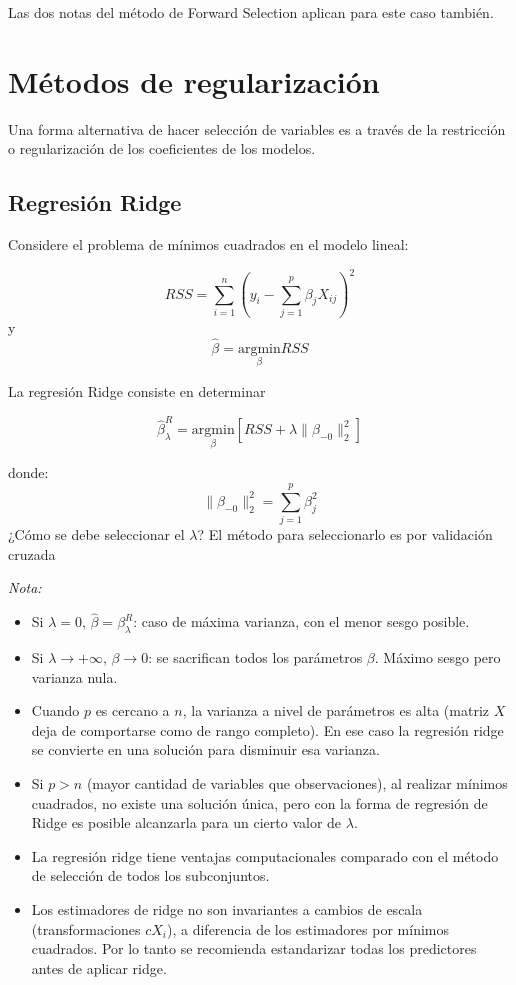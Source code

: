 \documentclass[
  12pt,
]{book}
\providecommand{\tightlist}{%
  \setlength{\itemsep}{0pt}\setlength{\parskip}{0pt}}
\begin{document}
Las dos notas del método de Forward Selection aplican para este caso
también.

\hypertarget{muxe9todos-de-regularizaciuxf3n}{%
\section{Métodos de
regularización}\label{muxe9todos-de-regularizaciuxf3n}}

Una forma alternativa de hacer selección de variables es a través de la
restricción o regularización de los coeficientes de los modelos.

\hypertarget{regresiuxf3n-ridge}{%
\subsection{Regresión Ridge}\label{regresiuxf3n-ridge}}

Considere el problema de mínimos cuadrados en el modelo lineal:

\[ RSS = \sum_{i=1}^{n}\left(y_i-\sum_{j=1}^{p}\beta_jX_{ij}\right)^2 \]
y \[
\hat\beta = \underset{\beta}{\mathrm{argmin}} RSS
\]

La regresión Ridge consiste en determinar

\[ \hat\beta^R_\lambda = \underset{\beta}{\mathrm{argmin}}\left[RSS + \lambda\|\beta_{-0}\|^2_2 \right]\]

donde: \[\|\beta_{-0}\|^2_2 = \sum_{j=1}^{p}\beta_j^2\] ¿Cómo se debe
seleccionar el \(\lambda\)? El método para seleccionarlo es por
validación cruzada

\emph{Nota:}

\begin{itemize}
\tightlist
\item
  Si \(\lambda = 0\), \(\hat\beta = \beta^R_\lambda\): caso de máxima
  varianza, con el menor sesgo posible.
\item
  Si \(\lambda \to +\infty\), \(\beta \to 0\): se sacrifican todos los
  parámetros \(\beta\). Máximo sesgo pero varianza nula.
\item
  Cuando \(p\) es cercano a \(n\), la varianza a nivel de parámetros es
  alta (matriz \(X\) deja de comportarse como de rango completo). En ese
  caso la regresión ridge se convierte en una solución para disminuir
  esa varianza.
\item
  Si \(p>n\) (mayor cantidad de variables que observaciones), al
  realizar mínimos cuadrados, no existe una solución única, pero con la
  forma de regresión de Ridge es posible alcanzarla para un cierto valor
  de \(\lambda\).
\item
  La regresión ridge tiene ventajas computacionales comparado con el
  método de selección de todos los subconjuntos.
\item
  Los estimadores de ridge no son invariantes a cambios de escala
  (transformaciones \(cX_i\)), a diferencia de los estimadores por
  mínimos cuadrados. Por lo tanto se recomienda estandarizar todas los
  predictores antes de aplicar ridge.
\end{itemize}
\end{document}
